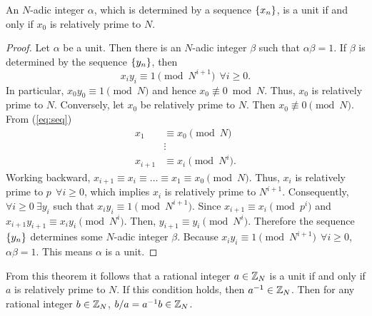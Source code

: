 \begin{theorem}\label{thm:units}
  An $N$-adic integer $\alpha$, which is determined by a sequence $\{x_n\}$, is
  a unit if and only if $x_0$ is relatively prime to $N$.
\end{theorem}
\begin{proof}
  Let $\alpha$ be a unit. Then there is an $N$-adic integer $\beta$ such that
  $\alpha\beta=1$. If $\beta$ is determined by the sequence $\{y_n\}$, then
  \begin{equation}\label{eq:units}
    x_iy_i\equiv1\pmod{N^{i+1}} \ \ \forall i \geq 0.
  \end{equation}
  In particular, $x_0y_0\equiv1\pmod N$ and hence $x_0\not\equiv0\bmod N$.
  Thus, $x_0$ is relatively prime to $N$.
  Conversely, let $x_0$ be relatively prime to $N$. Then $x_0\not\equiv0\pmod{N}$.
  From (\ref{eq:seq})
  \begin{align*}
    x_1 &\equiv x_0 \pmod N\\
    &\vdots \\
    x_{i+1} &\equiv x_i \pmod{N^i}. 
  \end{align*}
  Working backward, $x_{i+1} \equiv x_i \equiv \dots \equiv x_1 \equiv x_0 \pmod N$.
  Thus, $x_i$ is relatively prime to $p \ \ \forall i\geq0$, which implies
  $x_i$ is relatively prime to $N^{i+1}$. Consequently, $\forall i\geq0 \
  \exists y_i$ such that $x_iy_i \equiv 1 \pmod{N^{i+1}}$. Since
  $x_{i+1} \equiv x_i \pmod p^i$ and $x_{i+1}y_{i+1} \equiv x_iy_i \pmod{N^i}$.
  Then, $y_{i+1} \equiv y_i \pmod{N^i}$. Therefore the sequence $\{y_n\}$ determines
  some $N$-adic integer $\beta$. Because $x_iy_i \equiv 1 \pmod{N^{i+1}} \ \ \forall i \geq 0$,
  $\alpha\beta=1$. This means $\alpha$ is a unit.
\end{proof}

\par From this theorem it follows that a rational integer $a\in\mathbb{Z}_N$ is a unit if
and only if $a$ is relatively prime to $N$. If this condition holds, then $a^{-1}\in\mathbb{Z}_N$.
Then for any rational integer $b\in\mathbb{Z}_N$, $b/a=a^{-1}b\in\mathbb{Z}_N$.


